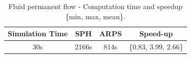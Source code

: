 \documentclass[11pt, oneside, a4paper]{memoir}
\begin{document}
\begin{table}[htb]
    \centering
\begin{tabular}{|c|c|c|c|} \hline
    Simulation Time & SPH       & ARPS    & Speed-up \\ \hline
    30s         & 2166s     & 814s              & \{0.83, 3.99, 2.66\} \\ \hline
\end{tabular}
\caption{\label{table:perf2}Fluid permanent flow - Computation time and speedup \{min, max, mean\}.}
\end{table}
\end{document}
